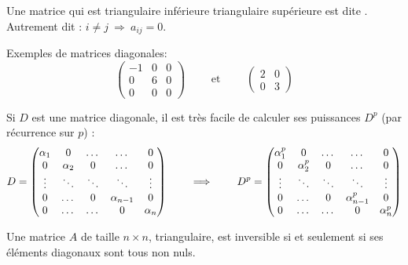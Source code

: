 \documentclass[class=report,crop=false]{standalone}
\begin{document}
Une matrice qui est triangulaire inférieure  triangulaire supérieure
est dite .
Autrement dit : $i\neq j \ \Longrightarrow \ a_{ij} = 0$.


\begin{exemple} Exemples de matrices diagonales:
$$\begin{pmatrix}
 -1 &  0 &0\\
 0 & 6 & 0\\
 0 & 0 &0
 \end{pmatrix} \qquad \text{ et } \qquad
 \begin{pmatrix}
 2 & 0\\
 0 & 3
\end{pmatrix}$$
\end{exemple}


\begin{exemple}
Si $D$ est une matrice diagonale, il est très facile de calculer ses puissances $D^p$
(par récurrence sur $p$) :
$$D=\begin{pmatrix}
\alpha_{1}& 0& \dots &  \dots & 0\cr
0& \alpha_{2}& 0&  \dots &0\cr
\vdots & \ddots & \ddots & \ddots & \vdots \cr
0& \dots & 0 & \alpha_{n-1} & 0 \cr
0& \dots & \dots & 0 & \alpha_{n}\cr
\end{pmatrix}
\qquad \implies \qquad
D^{p}=\begin{pmatrix}
\alpha_{1}^{p}& 0& \dots &  \dots & 0\cr
0& \alpha_{2}^{p}& 0&  \dots &0\cr
\vdots & \ddots & \ddots & \ddots & \vdots \cr
0& \dots & 0 & \alpha_{n-1}^{p} & 0 \cr
0& \dots & \dots & 0 & \alpha_{n}^{p}\cr
\end{pmatrix}$$
\end{exemple}



\begin{theoreme}
Une matrice $A$ de taille $n\times n$, triangulaire, est inversible
si et seulement si ses éléments diagonaux sont tous non nuls.
\end{theoreme}
\end{document}
